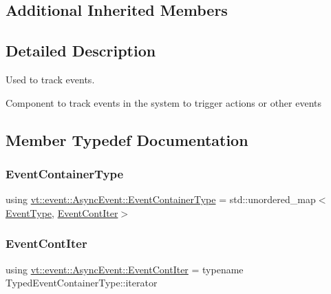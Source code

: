 \subsection*{Additional Inherited Members}


\subsection{Detailed Description}
Used to track events. 

Component to track events in the system to trigger actions or other events 

\subsection{Member Typedef Documentation}
\mbox{\label{structvt_1_1event_1_1_async_event_a391e9ac6236bd3dc5c884b8bc7e48257}} 
\subsubsection{\texorpdfstring{Event\+Container\+Type}{EventContainerType}}
{\footnotesize\ttfamily using \hyperlink{structvt_1_1event_1_1_async_event_a391e9ac6236bd3dc5c884b8bc7e48257}{vt\+::event\+::\+Async\+Event\+::\+Event\+Container\+Type} =  std\+::unordered\+\_\+map$<$\hyperlink{namespacevt_a009267401def7ae8bf201892222d060f}{Event\+Type}, \hyperlink{structvt_1_1event_1_1_async_event_a0f9634db3d6887c4a22076f6b9054e93}{Event\+Cont\+Iter}$>$}

\mbox{\label{structvt_1_1event_1_1_async_event_a0f9634db3d6887c4a22076f6b9054e93}} 
\subsubsection{\texorpdfstring{Event\+Cont\+Iter}{EventContIter}}
{\footnotesize\ttfamily using \hyperlink{structvt_1_1event_1_1_async_event_a0f9634db3d6887c4a22076f6b9054e93}{vt\+::event\+::\+Async\+Event\+::\+Event\+Cont\+Iter} =  typename Typed\+Event\+Container\+Type\+::iterator}

